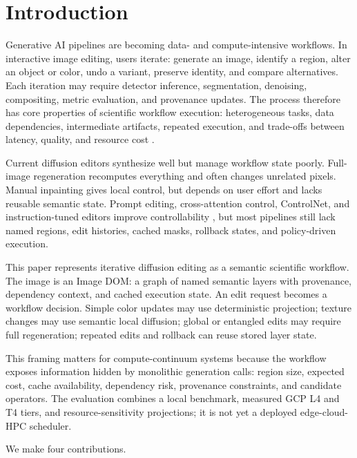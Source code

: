 \documentclass[final,5p,times,number,sort&compress]{elsarticle}
\newcommand{\imageDOM}{Image DOM}
\begin{document}
\section{Introduction}

Generative AI pipelines are becoming data- and compute-intensive workflows. In interactive image editing, users iterate: generate an image, identify a region, alter an object or color, undo a variant, preserve identity, and compare alternatives. Each iteration may require detector inference, segmentation, denoising, compositing, metric evaluation, and provenance updates. The process therefore has core properties of scientific workflow execution: heterogeneous tasks, data dependencies, intermediate artifacts, repeated execution, and trade-offs between latency, quality, and resource cost \citep{deelman2009workflows,liew2017scientific,ferreiradasilva2017characterization}.

Current diffusion editors synthesize well but manage workflow state poorly. Full-image regeneration recomputes everything and often changes unrelated pixels. Manual inpainting gives local control, but depends on user effort and lacks reusable semantic state. Prompt editing, cross-attention control, ControlNet, and instruction-tuned editors improve controllability \citep{hertz2023prompt,zhang2023controlnet,brooks2023instructpix2pix}, but most pipelines still lack named regions, edit histories, cached masks, rollback states, and policy-driven execution.

This paper represents iterative diffusion editing as a semantic scientific workflow. The image is an \imageDOM{}: a graph of named semantic layers with provenance, dependency context, and cached execution state. An edit request becomes a workflow decision. Simple color updates may use deterministic projection; texture changes may use semantic local diffusion; global or entangled edits may require full regeneration; repeated edits and rollback can reuse stored layer state.

This framing matters for compute-continuum systems because the workflow exposes information hidden by monolithic generation calls: region size, expected cost, cache availability, dependency risk, provenance constraints, and candidate operators. The evaluation combines a local benchmark, measured GCP L4 and T4 tiers, and resource-sensitivity projections; it is not yet a deployed edge-cloud-HPC scheduler.

We make four contributions.
\end{document}
